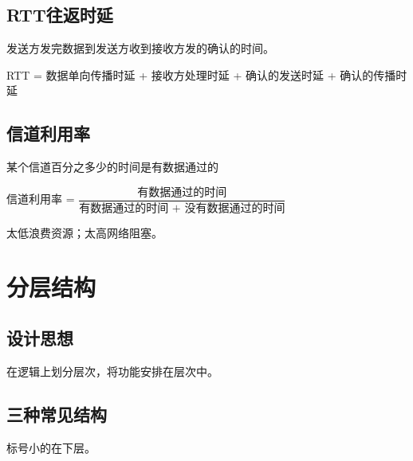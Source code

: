 \subsection{RTT往返时延}
发送方发完数据到发送方收到接收方发的确认的时间。

RTT = 数据单向传播时延 + 接收方处理时延 + 确认的发送时延 + 确认的传播时延


\subsection{信道利用率}
某个信道百分之多少的时间是有数据通过的

信道利用率 = \(\dfrac{\text{有数据通过的时间}}{\text{有数据通过的时间 + 没有数据通过的时间}}\)

太低浪费资源；太高网络阻塞。


\section{分层结构}

\subsection{设计思想}
在逻辑上划分层次，将功能安排在层次中。


\subsection{三种常见结构}
标号小的在下层。

